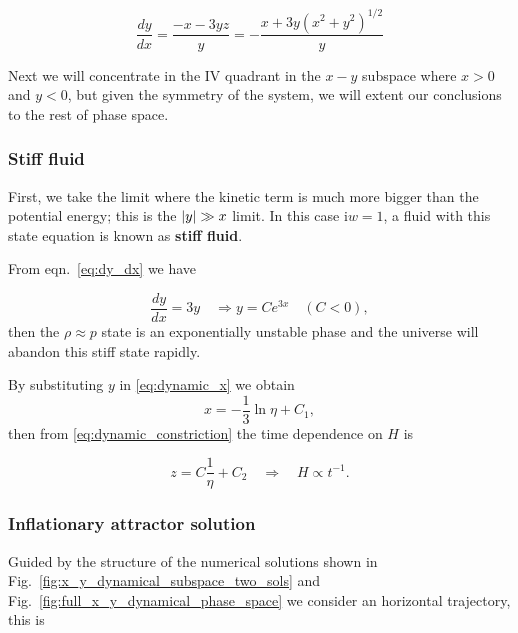 \documentclass[12pt,letterpaper,twoside]{book}
\DeclarePairedDelimiter\abs{\lvert}{\rvert}%
\begin{document}
\begin{equation}\label{eq:dy_dx}
    \frac{dy}{dx} =  \frac{-x -3yz}{y} =
                   - \frac{x+ 3 y \left(x^2 + y^2\right)^{1/2}}{y}
\end{equation}

Next we will concentrate in the IV quadrant in the $x-y$ subspace where $x>0$
and $y<0$, but given the symmetry of the system, we will extent our conclusions
to the rest of phase space.


\subsubsection{Stiff fluid}


First, we take the limit where the kinetic term is much more bigger than the
potential energy; this is the $\abs{y} \gg x$ limit. In this case i$w=1$, a
fluid with this state equation is known as \textbf{stiff fluid}.

From eqn.~\eqref{eq:dy_dx} we have

\begin{equation}
    \frac{dy}{dx} = 3 y \quad  \Rightarrow y = C e^{3x} \quad \left(C<0\right),
\end{equation}
then the $\rho \approx p$ state is an exponentially unstable phase and the
universe will abandon this stiff state rapidly.

By substituting $y$ in \eqref{eq:dynamic_x} we obtain
\begin{equation}
    x= - \frac{1}{3}\ln \eta + C_1,
\end{equation}
then from \eqref{eq:dynamic_constriction} the time dependence on $H$ is

\begin{equation}
    z=C \frac{1}{\eta} + C_2 \quad \Rightarrow  \quad H\propto t^{-1}.
\end{equation}




\subsubsection{Inflationary attractor solution}

Guided by the structure of the numerical solutions shown in
Fig.~\ref{fig:x_y_dynamical_subspace_two_sols} and
Fig.~\ref{fig:full_x_y_dynamical_phase_space} we consider an horizontal trajectory,
this is
\end{document}
